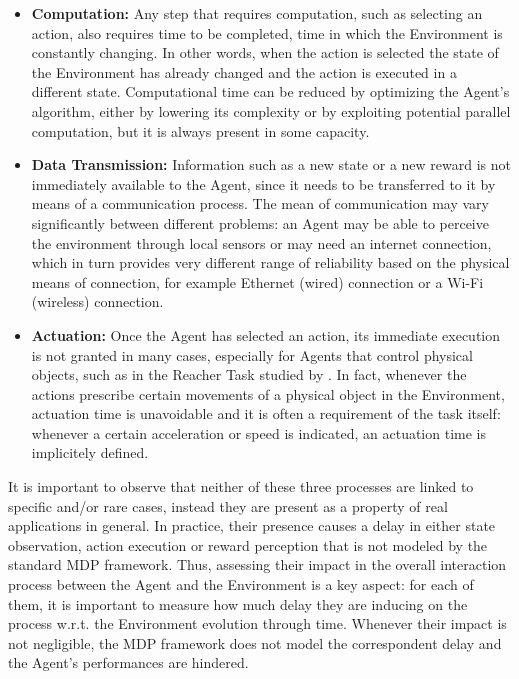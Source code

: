     \begin{itemize}
        \item \textbf{Computation:} Any step that requires computation, such as selecting an action, also requires time to be completed, time in which the Environment is constantly changing. In other words, when the action is selected the state of the Environment has already changed and the action is executed in a different state. Computational time can be reduced by optimizing the Agent's algorithm, either by lowering its complexity or by exploiting potential parallel computation, but it is always present in some capacity.
        \item \textbf{Data Transmission:} Information such as a new state or a new reward is not immediately available to the Agent, since it needs to be transferred to it by means of a communication process. The mean of communication may vary significantly between different problems: an Agent may be able to perceive the environment through local sensors or may need an internet connection, which in turn provides very different range of reliability based on the physical means of connection, for example Ethernet (wired) connection or a Wi-Fi (wireless) connection.
        \item \textbf{Actuation:} Once the Agent has selected an action, its immediate execution is not granted in many cases, especially for Agents that control physical objects, such as in the Reacher Task studied by . In fact, whenever the actions prescribe certain movements of a physical object in the Environment, actuation time is unavoidable and it is often a requirement of the task itself: whenever a certain acceleration or speed is indicated, an actuation time is implicitely defined. 
    \end{itemize}
    \noindent
    It is important to observe that neither of these three processes are linked to specific and/or rare cases, instead they are present as a property of real applications in general. In practice, their presence causes a delay in either state observation, action execution or reward perception that is not modeled by the standard MDP framework. Thus, assessing their impact in the overall interaction process between the Agent and the Environment is a key aspect: for each of them, it is important to measure how much delay they are inducing on the process w.r.t. the Environment evolution through time. Whenever their impact is not negligible, the MDP framework does not model the correspondent delay and the Agent's performances are hindered. 
